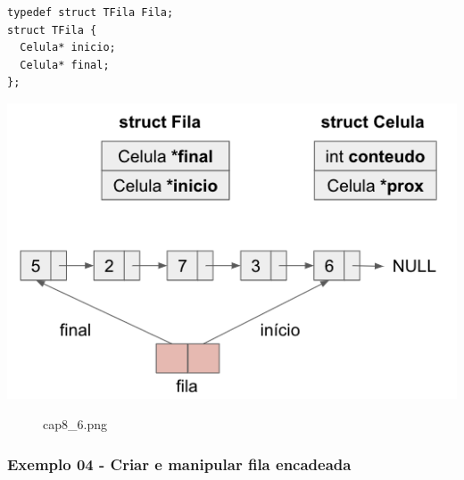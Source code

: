 \documentclass[12pt,a4paper]{article}
\begin{document}
    \begin{verbatim}
typedef struct TFila Fila;
struct TFila {
  Celula* inicio;
  Celula* final;
};
\end{verbatim}

\includegraphics{"figs/cap8_6.png"}

    \begin{figure}
\centering
\caption{cap8\_6.png}
\end{figure}

    \hypertarget{exemplo-04---criar-e-manipular-fila-encadeada}{%
\subsubsection{Exemplo 04 - Criar e manipular fila
encadeada}\label{exemplo-04---criar-e-manipular-fila-encadeada}}
\end{document}
